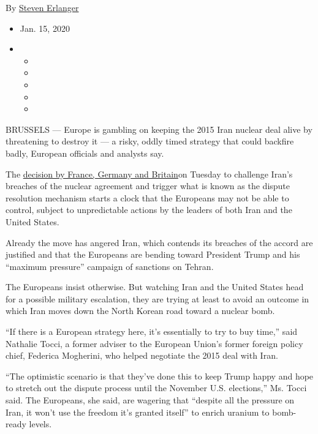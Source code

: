 By \href{https://www.nytimes.com/by/steven-erlanger}{Steven Erlanger}

\begin{itemize}
\item
  Jan. 15, 2020
\item
  \begin{itemize}
  \item
  \item
  \item
  \item
  \item
  \end{itemize}
\end{itemize}

BRUSSELS --- Europe is gambling on keeping the 2015 Iran nuclear deal
alive by threatening to destroy it --- a risky, oddly timed strategy
that could backfire badly, European officials and analysts say.

The
\href{https://www.nytimes.com/2020/01/14/world/europe/iran-nuclear-deal.html?searchResultPosition=1}{decision
by France, Germany and Britain}on Tuesday to challenge Iran's breaches
of the nuclear agreement and trigger what is known as the dispute
resolution mechanism starts a clock that the Europeans may not be able
to control, subject to unpredictable actions by the leaders of both Iran
and the United States.

Already the move has angered Iran, which contends its breaches of the
accord are justified and that the Europeans are bending toward President
Trump and his ``maximum pressure'' campaign of sanctions on Tehran.

The Europeans insist otherwise. But watching Iran and the United States
head for a possible military escalation, they are trying at least to
avoid an outcome in which Iran moves down the North Korean road toward a
nuclear bomb.

``If there is a European strategy here, it's essentially to try to buy
time,'' said Nathalie Tocci, a former adviser to the European Union's
former foreign policy chief, Federica Mogherini, who helped negotiate
the 2015 deal with Iran.

``The optimistic scenario is that they've done this to keep Trump happy
and hope to stretch out the dispute process until the November U.S.
elections,'' Ms. Tocci said. The Europeans, she said, are wagering that
``despite all the pressure on Iran, it won't use the freedom it's
granted itself'' to enrich uranium to bomb-ready levels.

